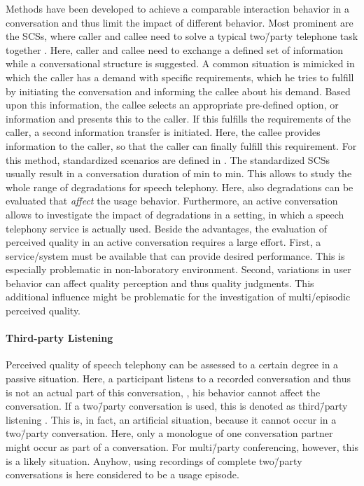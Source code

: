 Methods have been developed to achieve a comparable interaction behavior in a conversation and thus limit the impact of different behavior.
Most prominent are the \acp{SCS}, where caller and callee need to solve a typical two\=/party telephone task together \citep[][p.\,76]{moller_assessment_2000}.
Here, caller and callee need to exchange a defined set of information while a conversational structure is suggested.
A common situation is mimicked in which the caller has a demand with specific requirements, which he tries to fulfill by initiating the conversation and informing the callee about his demand.
Based upon this information, the callee selects an appropriate pre-defined option, or information and presents this to the caller.
If this fulfills the requirements of the caller, a second information transfer is initiated.
Here, the callee provides information to the caller, so that the caller can finally fulfill this requirement.
For this method, standardized scenarios are defined in \citet{itu-t_recommendation_p.805_subjective_2007}.
The standardized \acp{SCS} usually result in a conversation duration of \unit[3]{min} to \unit[7]{min}.
This allows to study the whole range of degradations for speech telephony.
Here, also degradations can be evaluated that \emph{affect} the usage behavior. %
Furthermore, an active conversation allows to investigate the impact of degradations in a setting, in which a speech telephony service is actually used.
Beside the advantages, the evaluation of perceived quality in an active conversation requires a large effort.
First, a service/system must be available that can provide desired performance.
This is especially problematic in non-laboratory environment.
Second, variations in user behavior can affect quality perception and thus quality judgments.
This additional influence might be problematic for the investigation of multi\-/episodic perceived quality.

\paragraph*{Third-party Listening}
Perceived quality of speech telephony can be assessed  to a certain degree in a passive situation.
Here, a participant listens to a recorded conversation and thus is not an actual part of this conversation, \ie, his behavior cannot affect the conversation.
If a two\=/party conversation is used, this is denoted as third\=/party listening \citep[][p.\,13]{itu-t_recommendation_p.832_subjective_2000}.
This is, in fact, an artificial situation, because it cannot occur in a two\=/party conversation.
Here, only a monologue of one conversation partner might occur as part of a conversation.
For multi\=/party conferencing, however, this is a likely situation.
Anyhow, using recordings of complete two\=/party conversations is here considered to be a usage episode.

